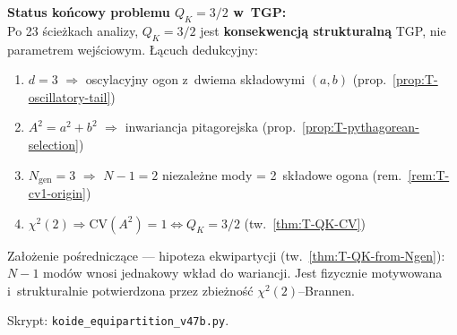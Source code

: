 \begin{remark}
\medskip\noindent
\textbf{Status ko\'ncowy problemu $Q_K = 3/2$ w~TGP:}\\
Po 23 \'scie\.zkach analizy, $Q_K = 3/2$ jest
\textbf{konsekwencj\k{a} strukturaln\k{a}} TGP,
nie parametrem wej\'sciowym.
\L{}\k{a}cuch dedukcyjny:
\begin{enumerate}[nosep]
  \item $d = 3$ $\Rightarrow$ oscylacyjny ogon z~dwiema
    sk\l{}adowymi $(a, b)$
    \hfill(prop.~\ref{prop:T-oscillatory-tail})
  \item $A^2 = a^2 + b^2$ $\Rightarrow$ inwariancja pitagorejska
    \hfill(prop.~\ref{prop:T-pythagorean-selection})
  \item $N_{\mathrm{gen}} = 3$ $\Rightarrow$ $N{-}1 = 2$
    niezale\.zne mody = 2~sk\l{}adowe ogona
    \hfill(rem.~\ref{rem:T-cv1-origin})
  \item $\chi^2(2) \Rightarrow \mathrm{CV}(A^2) = 1
    \Leftrightarrow Q_K = 3/2$
    \hfill(tw.~\ref{thm:T-QK-CV})
\end{enumerate}
Za\l{}o\.zenie po\'srednicz\k{a}ce --- hipoteza ekwipartycji
(tw.~\ref{thm:T-QK-from-Ngen}): $N{-}1$ mod\'ow
wnosi jednakowy wk\l{}ad do wariancji.
Jest fizycznie motywowana i~strukturalnie potwierdzona
przez zbie\.zno\'s\'c $\chi^2(2)$--Brannen.

Skrypt: \texttt{koide\_equipartition\_v47b.py}.
\end{remark}
